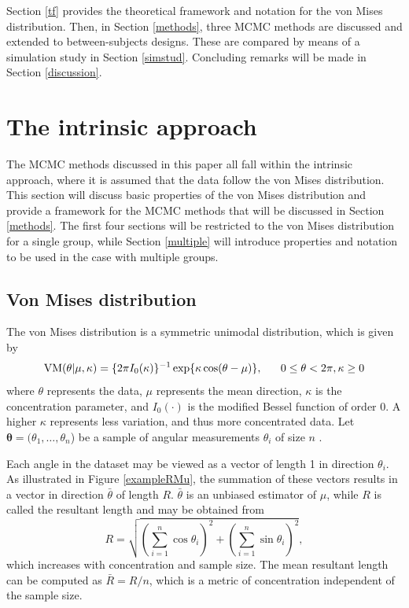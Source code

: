 \documentclass[]{gSCS2e}
\theoremstyle{plain}
\theoremstyle{definition}
\theoremstyle{remark}
\begin{document}
Section \ref{tf} provides the theoretical framework and notation for the von Mises distribution. Then, in Section \ref{methods}, three MCMC methods are discussed and extended to between-subjects designs. These are compared by means of a simulation study in Section \ref{simstud}. Concluding remarks will be made in Section \ref{discussion}.

\section{The intrinsic approach \label{tf}}

The MCMC methods discussed in this paper all fall within the intrinsic approach, where it is assumed that the data follow the von Mises distribution. This section will discuss basic properties of the von Mises distribution and provide a framework for the MCMC methods that will be discussed in Section \ref{methods}. The first four sections will be restricted to the von Mises distribution for a single group, while Section \ref{multiple} will introduce properties and notation to be used in the case with multiple groups. 

\subsection{Von Mises distribution}

The von Mises distribution is a symmetric unimodal distribution, which is given by
$$ \textnormal{VM}(\theta \vert \mu, \kappa) = \{2 \pi I_0(\kappa)\}^{-1} \exp\{\kappa \cos(\theta - \mu)\} , ~~~~~ 0\leq \theta < 2\pi, \kappa \geq 0$$
where $\theta$ represents the data, $\mu$ represents the mean direction, $\kappa$ is the concentration parameter, and $I_0(\cdot)$ is the modified Bessel function of order 0.\cite{abramowitz1972handbook} A higher $\kappa$ represents less variation, and thus more concentrated data. Let $\boldsymbol\theta=(\theta_1, \dots, \theta_n$) be a sample of angular measurements $\theta_i$ of size $n$%
.

Each angle in the dataset may be viewed as a vector of length 1 in direction $\theta_i$. As illustrated in Figure \ref{exampleRMu}, the summation of these vectors results in a vector in direction $\bar{\theta}$ of length $R$. $\bar{\theta}$ is an unbiased estimator of $\mu$, while $R$ is called the resultant length and may be obtained from
$$ R = \sqrt{\left(\sum_{i=1}^{n} \cos \theta_i \right)^2 + \left(\sum_{i=1}^{n} \sin \theta_i \right)^2},$$
which increases with concentration and sample size. The mean resultant length can be computed as $\bar{R} = R/n$, which is a metric of concentration independent of the sample size. %
\end{document}
